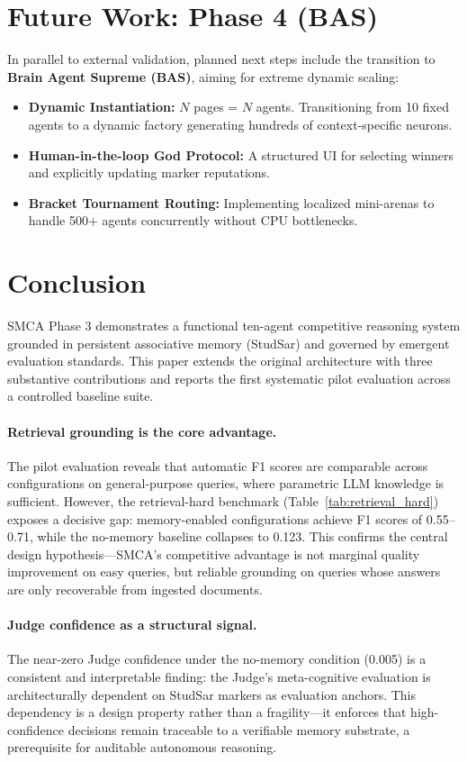 \documentclass[11pt, a4paper]{article}
\begin{document}
\section{Future Work: Phase 4 (BAS)}
In parallel to external validation, planned next steps include the transition to \textbf{Brain Agent Supreme (BAS)}, aiming for extreme dynamic scaling:
\begin{itemize}
  \item \textbf{Dynamic Instantiation:} $N$ pages = $N$ agents. Transitioning from 10 fixed agents to a dynamic factory generating hundreds of context-specific neurons.
  \item \textbf{Human-in-the-loop God Protocol:} A structured UI for selecting winners and explicitly updating marker reputations.
  \item \textbf{Bracket Tournament Routing:} Implementing localized mini-arenas to handle 500+ agents concurrently without CPU bottlenecks.
\end{itemize}

\section{Conclusion}
\label{sec:conclusion}

SMCA Phase 3 demonstrates a functional ten-agent competitive reasoning system grounded in persistent associative memory (StudSar) and governed by emergent evaluation standards. This paper extends the original architecture with three substantive contributions and reports the first systematic pilot evaluation across a controlled baseline suite.

\paragraph{Retrieval grounding is the core advantage.}
The pilot evaluation reveals that automatic F1 scores are comparable across configurations on general-purpose queries, where parametric LLM knowledge is sufficient. However, the retrieval-hard benchmark (Table~\ref{tab:retrieval_hard}) exposes a decisive gap: memory-enabled configurations achieve F1 scores of 0.55--0.71, while the no-memory baseline collapses to 0.123. This confirms the central design hypothesis---SMCA's competitive advantage is not marginal quality improvement on easy queries, but reliable grounding on queries whose answers are only recoverable from ingested documents.

\paragraph{Judge confidence as a structural signal.}
The near-zero Judge confidence under the no-memory condition (0.005) is a consistent and interpretable finding: the Judge's meta-cognitive evaluation is architecturally dependent on StudSar markers as evaluation anchors. This dependency is a design property rather than a fragility---it enforces that high-confidence decisions remain traceable to a verifiable memory substrate, a prerequisite for auditable autonomous reasoning.
\end{document}
